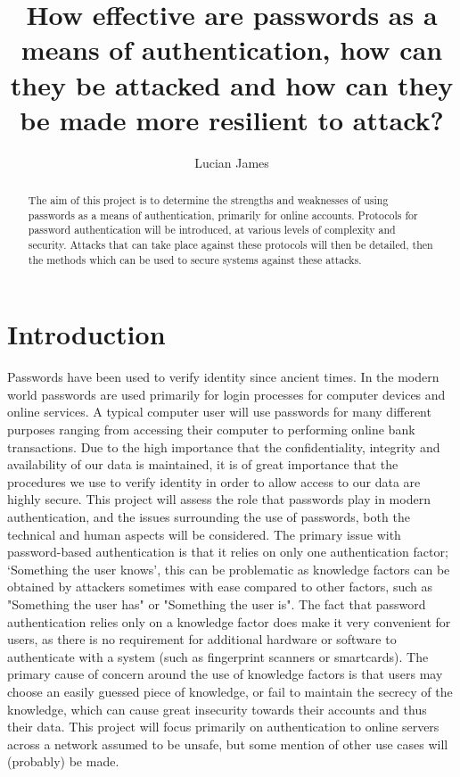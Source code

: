 \documentclass[11pt]{article}
\title{How effective are passwords as a means of authentication, how can they be attacked and how can they be made more resilient to attack?}
\author{Lucian James}
\let\oldcite=\cite
\renewcommand\cite[1]{\ifthenelse{\equal{#1}{NEEDED}}{[citation~needed]}{\oldcite{#1}}}
\begin{document}
\maketitle
\begin{abstract}
The aim of this project is to determine the strengths and weaknesses of using passwords as a means of authentication, primarily for online accounts.
Protocols for password authentication will be introduced, at various levels of complexity and security.
Attacks that can take place against these protocols will then be detailed, then the methods which can be used to secure systems against these attacks.
\end{abstract}



\section{Introduction} \label{INTRO}
Passwords have been used to verify identity since ancient times\cite{NEEDED}.
In the modern world passwords are used primarily for login processes for computer devices and online services. 
A typical computer user will use passwords for many different purposes ranging from accessing their computer to performing online bank transactions.
Due to the high importance that the confidentiality, integrity and availability of our data is maintained, it is of great importance that the procedures we use to verify identity in order to allow access to our data are highly secure.
This project will assess the role that passwords play in modern authentication, and the issues surrounding the use of passwords, both the technical and human aspects will be considered.
The primary issue with password-based authentication is that it relies on only one authentication factor; `Something the user knows', this can be problematic as knowledge factors can be obtained by attackers sometimes with ease compared to other factors, such as "Something the user has" or "Something the user is".
The fact that password authentication relies only on a knowledge factor does make it very convenient for users, as there is no requirement for additional hardware or software to authenticate with a system (such as fingerprint scanners or smartcards).
The primary cause of concern around the use of knowledge factors is that users may choose an easily guessed piece of knowledge, or fail to maintain the secrecy of the knowledge, which can cause great insecurity towards their accounts and thus their data.
This project will focus primarily on authentication to online servers across a network assumed to be unsafe, but some mention of other use cases will (probably) be made.\\
\end{document}
